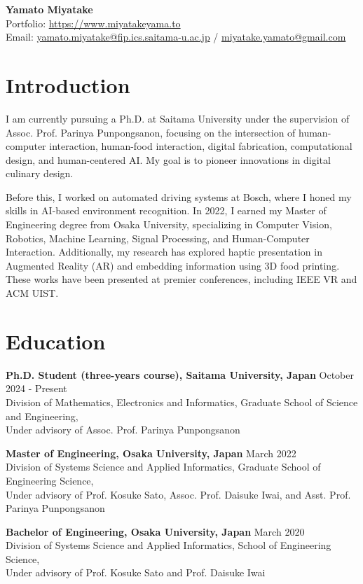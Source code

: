 \documentclass[10pt,a4paper]{article}
\newcommand{\daterange}[1]{\hfill #1}
\begin{document}
{\LARGE\bfseries\sffamily Yamato Miyatake}\\
Portfolio: \href{https://www.miyatakeyama.to}{https://www.miyatakeyama.to}\\
Email: \href{mailto:yamato.miyatake@fip.ics.saitama-u.ac.jp}{yamato.miyatake@fip.ics.saitama-u.ac.jp} / \href{mailto:miyatake.yamato@gmail.com}{miyatake.yamato@gmail.com}

\section*{Introduction}
I am currently pursuing a Ph.D. at Saitama University under the supervision of Assoc. Prof. Parinya Punpongsanon, focusing on the intersection of human-computer interaction, human-food interaction, digital fabrication, computational design, and human-centered AI. My goal is to pioneer innovations in digital culinary design.

Before this, I worked on automated driving systems at Bosch, where I honed my skills in AI-based environment recognition. In 2022, I earned my Master of Engineering degree from Osaka University, specializing in Computer Vision, Robotics, Machine Learning, Signal Processing, and Human-Computer Interaction. Additionally, my research has explored haptic presentation in Augmented Reality (AR) and embedding information using 3D food printing. These works have been presented at premier conferences, including IEEE VR and ACM UIST.

\section*{Education}
\textbf{Ph.D. Student (three-years course), Saitama University, Japan} \daterange{October 2024 - Present}\\
Division of Mathematics, Electronics and Informatics, Graduate School of Science and Engineering,\\
Under advisory of Assoc. Prof. Parinya Punpongsanon

\textbf{Master of Engineering, Osaka University, Japan} \daterange{March 2022}\\
Division of Systems Science and Applied Informatics, Graduate School of Engineering Science,\\
Under advisory of Prof. Kosuke Sato, Assoc. Prof. Daisuke Iwai, and Asst. Prof. Parinya Punpongsanon

\textbf{Bachelor of Engineering, Osaka University, Japan} \daterange{March 2020}\\
Division of Systems Science and Applied Informatics, School of Engineering Science,\\
Under advisory of Prof. Kosuke Sato and Prof. Daisuke Iwai
\end{document}
